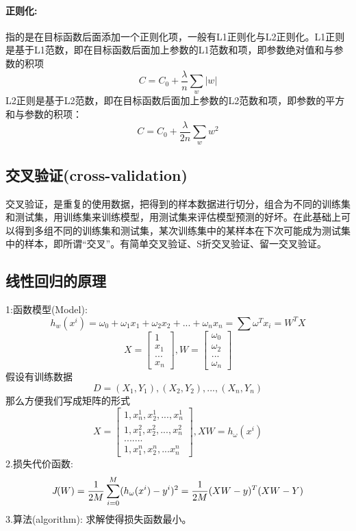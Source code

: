 \documentclass[18pt,a4paper,oneside,UTF8]{ctexart}
\begin{document}
\paragraph{正则化:}
指的是在目标函数后面添加一个正则化项，一般有L1正则化与L2正则化。L1正则是基于L1范数，即在目标函数后面加上参数的L1范数和项，即参数绝对值和与参数的积项
\[
    C=C_0+\frac {\lambda }{n} \sum_w |w|
\]
L2正则是基于L2范数，即在目标函数后面加上参数的L2范数和项，即参数的平方和与参数的积项：
\[
    C=C_0+\frac {\lambda}{2n} \sum_w w^2    
\]
\subsection{交叉验证(cross-validation)}
交叉验证，是重复的使用数据，把得到的样本数据进行切分，组合为不同的训练集和测试集，用训练集来训练模型，用测试集来评估模型预测的好坏。在此基础上可以得到多组不同的训练集和测试集，某次训练集中的某样本在下次可能成为测试集中的样本，即所谓“交叉”。有简单交叉验证、S折交叉验证、留一交叉验证。
\subsection{线性回归的原理}
1:函数模型(Model):
\[
    h_w(x^i)=\omega_0+\omega_1 x_1+\omega_2 x_2+...+\omega_n x_n=\sum \omega^T x_i=W^T X 
\]
\begin{equation} 
X={ \left[ \begin{array}{ccc} 1\\x_1\\...\\x_n \end{array} \right ]}, W={ \left[ \begin{array}{ccc} \omega_0\\
    \omega_2
    \\...
    \\\omega_n 
\end{array} \right ]} 
\end{equation}
假设有训练数据
\[
    D={(X_1,Y_1),(X_2,Y_2),...,(X_n,Y_n)}    
\]
那么方便我们写成矩阵的形式
\[
    X={\left [\begin{array}{ccc}
        1,x^1_n,x^1_2,...,x^1_n\\
        1,x^2_1,x^2_2,...,x^2_n\\
        .......\\
        1,x^n_1,x^n_2,...x^n_n
    \end{array} \right]}  
    ,XW=h_\omega(x^i)    
\]
2.损失代价函数:
\[
    \emph{J}(W)=\frac {1}{2M}\sum_{i=0}^M(h_\omega(x^i)-y^i)^2=\frac {1}{2M}(XW-y)^T(XW-Y)
\]
3.算法(algorithm):
求解使得损失函数最小。
\end{document}
